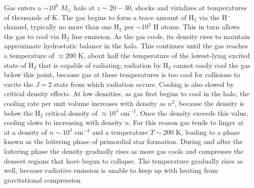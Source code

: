 Gas enters a $\sim 10^6$ $M_\odot$ halo at $z\sim 20-30$, shocks and virializes at temperatures of thousands of K. The gas begins to form a trace amount of H$_2$ via the H$^{-}$ channel, typically no more than one H$_2$ per $\sim 10^3$ H atoms. This in turn allows the gas to cool via H$_2$ line emission. As the gas cools, its density rises to maintain approximate hydrostatic balance in the halo. This continues until the gas reaches a temperature of $\approx 200$ K, about half the temperature of the lowest-lying excited state of H$_2$ that is capable of radiating; radiation by H$_2$ cannot easily cool the gas below this point, because gas at these temperatures is too cool for collisions to excite the $J=2$ state from which radiation occurs. Cooling is also slowed by critical density effects. At low densities, as gas first begins to cool in the halo, the cooling rate per unit volume increases with density as $n^2$, because the density is below the H$_2$ critical density of $\approx 10^4$ cm$^{-3}$. Once the density exceeds this value, cooling slows to increasing with density $n$. For this reason gas tends to linger at at a density of $n\sim 10^4$ cm$^{-3}$ and a temperature $T\sim 200$ K, leading to a phase known as the loitering phase of primordial star formation. During and after the loitering phase the density gradually rises as more gas cools and compresses the densest regions that have begun to collapse. The temperature gradually rises as well, because radiative emission is unable to keep up with heating from gravitational compression.


